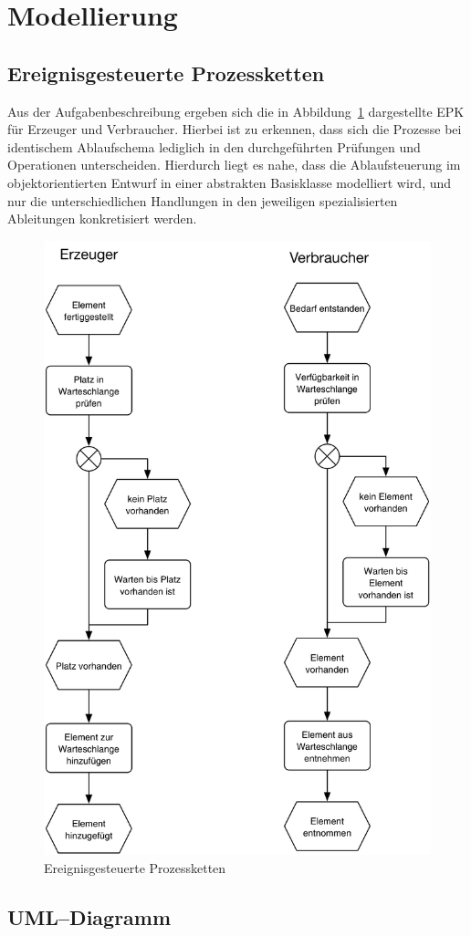 \newpage
\section{Modellierung} %
\label{sec:modellierung}

\subsection{Ereignisgesteuerte Prozessketten} %
\label{sub:ereignisgesteuerte_prozessketten}

Aus der Aufgabenbeschreibung ergeben sich die in Abbildung~\ref{fig:epk} dargestellte \ac{EPK} für Erzeuger und Verbraucher. Hierbei ist zu erkennen, dass sich die Prozesse bei identischem Ablaufschema lediglich in den  durchgeführten Prüfungen und Operationen unterscheiden. Hierdurch liegt es nahe, dass die Ablaufsteuerung im objektorientierten Entwurf in einer abstrakten Basisklasse modelliert wird, und nur die unterschiedlichen Handlungen in den jeweiligen spezialisierten Ableitungen konkretisiert werden.

\begin{figure}[H]
\begin{center}
\includegraphics[width=.5\textwidth]{Erzeuger-Verbraucher-EPK.jpg}
\caption{Ereignisgesteuerte Prozessketten}
\label{fig:epk}
\end{center}
\end{figure}


\subsection{UML–Diagramm} %


